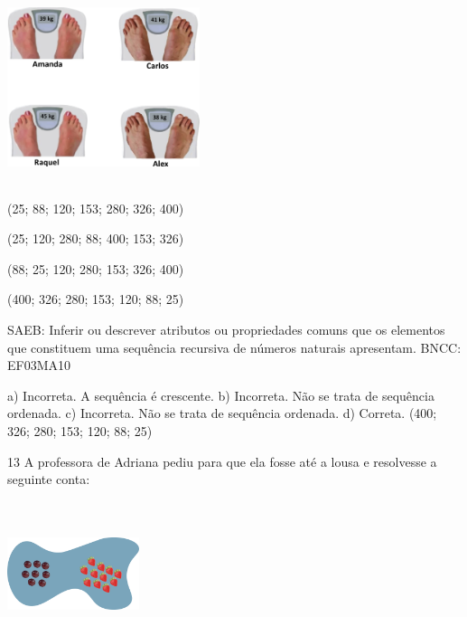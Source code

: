 \begin{multicols}{2}
{\begin{escolha}
{%

\includegraphics[width=2.21686in,height=2.20852in]{media/image113.png}

\begin{escolha}
\item
  (25; 88; 120; 153; 280; 326; 400)
\item
  (25; 120; 280; 88; 400; 153; 326)
\item
  (88; 25; 120; 280; 153; 326; 400)
\item
  (400; 326; 280; 153; 120; 88; 25)
\end{escolha}

SAEB: Inferir ou descrever atributos ou propriedades comuns
que os elementos que constituem uma sequência recursiva de números
naturais apresentam.
BNCC: EF03MA10

a) Incorreta. A sequência é crescente.
b) Incorreta. Não se trata de sequência ordenada.
c) Incorreta. Não se trata de sequência ordenada.
d) Correta. (400; 326; 280; 153; 120; 88; 25)

\num{13} A professora de Adriana pediu para que ela fosse até a lousa e resolvesse a seguinte conta:


\includegraphics[width=1.51680in,height=1.67515in]{media/image114.png}

}
\end{escolha}}
\end{multicols}

